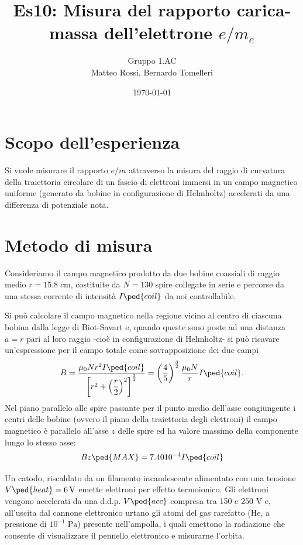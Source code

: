 \documentclass[10pt, a4paper, italian]{article}
\author{Gruppo 1.AC \\ Matteo Rossi, Bernardo Tomelleri}
\title{Es10: Misura del rapporto carica-massa dell'elettrone $e/m_e$}
\begin{document}
\date{\today}
\maketitle

\section{Scopo dell'esperienza}
Si vuole misurare il rapporto $e/m$ attraverso la misura del raggio di
curvatura della traiettoria circolare di un fascio di elettroni immersi in un
campo magnetico uniforme (generato da bobine in configurazione di Helmholtz)
accelerati da una differenza di potenziale nota.

\section{Metodo di misura}
Consideriamo il campo magnetico prodotto da due bobine coassiali di raggio
medio $r = 15.8 \; \si{c\m}$, costituite da $N = 130$ spire collegate in
serie e percorse da una stessa corrente di intensità $I\ped{coil}$ da noi
controllabile.

Si può calcolare il campo magnetico nella regione vicino al centro di ciascuna
bobina dalla legge di Biot-Savart e, quando queste sono poste ad una distanza
$a = r$ pari al loro raggio -cioè in configurazione di Helmholtz- si può
ricavare un'espressione per il campo totale come sovrapposizione dei due campi
\begin{equation}\label{eq: B-helm}
    B = \frac{\mu_0 N r^2 I\ped{coil}}{\left[r^2 + \left(\dfrac{r}{2}\right)^2
    \right]^\frac{3}{2}} =
    \left(\frac{4}{5}\right)^{\frac{3}{2}} \frac{\mu_{0} N}{r} I\ped{coil}.
\end{equation}
Nel piano parallelo alle spire passante per il punto medio dell'asse
congiungente i centri delle bobine (ovvero il piano della traiettoria degli
elettroni) il campo magnetico è parallelo all'asse $z$ delle spire ed ha
valore massimo della componente lungo lo stesso asse:
\begin{equation}\label{eq: Bmax}
Bz\ped{MAX} = 7.40 10^{-4} I\ped{coil}
\end{equation}


Un catodo, riscaldato da un filamento incandescente alimentato con una
tensione $V\ped{heat} = \SI{6}{\V}$ emette elettroni per effetto termoionico.
Gli elettroni vengono accelerati da una d.d.p. $V\ped{acc}$ compresa tra 150
e 250 V e, all'uscita dal cannone elettronico urtano gli atomi del gas
rarefatto (He, a pressione di $10^{-1} \; \si{\Pa}$) presente nell'ampolla,
i quali emettono la radiazione che consente di visualizzare il pennello elettronico e
misurarne l'orbita.
\end{document}
